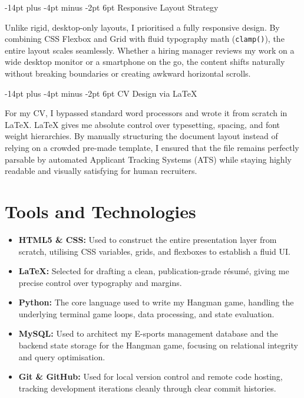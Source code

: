 \documentclass[12pt, a4paper]{report}
\makeatletter
\renewcommand\section{%
  \@startsection{section}{1}{\z@}%
    {-14pt plus -4pt minus -2pt}%
    {6pt}%
    {\normalfont\fontsize{14}{18}\bfseries\color{midPurple}}%
}
\makeatother
\begin{document}
\section{Responsive Layout Strategy}

Unlike rigid, desktop-only layouts, I prioritised a fully responsive design.
By combining CSS Flexbox and Grid with fluid typography math
(\verb|clamp()|), the entire layout scales seamlessly. Whether a hiring
manager reviews my work on a wide desktop monitor or a smartphone on the go,
the content shifts naturally without breaking boundaries or creating awkward
horizontal scrolls.

\section{CV Design via LaTeX}

For my CV, I bypassed standard word processors and wrote it from scratch
in LaTeX. LaTeX gives me absolute control over typesetting, spacing,
and font weight hierarchies. By manually structuring the document layout
instead of relying on a crowded pre-made template, I ensured that the file
remains perfectly parsable by automated Applicant Tracking Systems (ATS)
while staying highly readable and visually satisfying for human recruiters.

\chapter{Tools and Technologies}

\begin{itemize}
  \item \textbf{HTML5 \& CSS:} Used to construct the entire presentation
        layer from scratch, utilising CSS variables, grids, and flexboxes to
        establish a fluid UI.

  \item \textbf{LaTeX:} Selected for drafting a clean, publication-grade
        r\'{e}sum\'{e}, giving me precise control over typography and margins.

  \item \textbf{Python:} The core language used to write my Hangman game,
        handling the underlying terminal game loops, data processing, and
        state evaluation.

  \item \textbf{MySQL:} Used to architect my E-sports management database
        and the backend state storage for the Hangman game, focusing on
        relational integrity and query optimisation.

  \item \textbf{Git \& GitHub:} Used for local version control and remote
        code hosting, tracking development iterations cleanly through clear
        commit histories.
\end{itemize}
\end{document}
